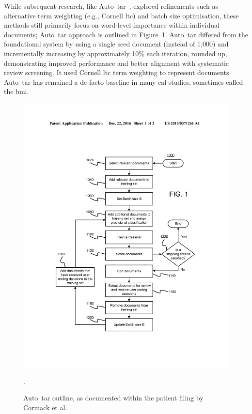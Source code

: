 \documentclass[10pt,oneside]{book}
\begin{document}
While subsequent research, like Auto~\gls*{tar}~\cite{cormack_autonomy_2015}, explored refinements such as alternative term weighting (e.g., Cornell ltc) and batch size optimisation, these methods still primarily focus on word-level importance within individual documents; Auto~\gls*{tar} approach is outlined in Figure~\ref{fig:autotar_process}. Auto~\gls*{tar} differed from the foundational system by using a single seed document (instead of 1,000) and incrementally increasing by approximately 10\% each iteration, rounded up, demonstrating improved performance and better alignment with systematic review screening. It used Cornell ltc term weighting \cite{salton_smart_1965} to represent documents. Auto~\gls*{tar} has remained a de facto baseline in many \gls*{cal} studies, sometimes called the \gls*{bmi}.

\begin{figure}
    \centering
    \includegraphics[width=0.95\linewidth]{Confirmation Review/images/autotar.jpg}
    \caption{Auto~\gls*{tar} outline, as documented within the patient filing by Cormack et al. \cite{cormack_systems_2016}\protect\footnotemark}.
    \label{fig:autotar_process}
\end{figure}
\end{document}
